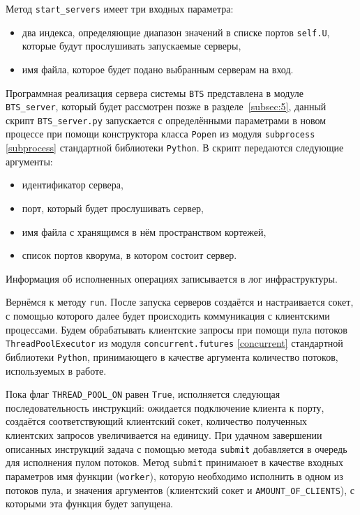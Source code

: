 Метод \texttt{start_servers} имеет три входных параметра:
\begin{itemize}
	\item два индекса, определяющие диапазон значений в списке портов \texttt{self.U}, которые будут прослушивать запускаемые серверы,
	\item имя файла, которое будет подано выбранным серверам на вход.
\end{itemize}
Программная реализация сервера системы \texttt{BTS} представлена в модуле \texttt{BTS_server}, который будет рассмотрен позже в разделе~\ref{subsec:5}, данный скрипт \texttt{BTS_server.py} запускается с определёнными параметрами в новом процессе при помощи конструктора класса \texttt{Popen} из модуля \texttt{subprocess} \ref{subprocess} стандартной библиотеки \texttt{Python}. В скрипт передаются следующие аргументы:
\begin{itemize}
	\item идентификатор сервера,
	\item порт, который будет прослушивать сервер,
	\item имя файла с хранящимся в нём пространством кортежей,
	\item список портов кворума, в котором состоит сервер.
\end{itemize}
Информация об исполненных операциях записывается в лог инфраструктуры.

Вернёмся к методу \texttt{run}. После запуска серверов создаётся и настраивается сокет, с помощью которого далее будет происходить коммуникация с клиентскими процессами. Будем обрабатывать клиентские запросы при помощи пула потоков \texttt{ThreadPoolExecutor} из модуля \texttt{concurrent.futures} \ref{concurrent} стандартной библиотеки \texttt{Python}, принимающего в качестве аргумента количество потоков, используемых в работе.

Пока флаг \texttt{THREAD_POOL_ON} равен \texttt{True}, исполняется следующая последовательность инструкций: ожидается подключение клиента к порту, создаётся соответствующий клиентский сокет, количество полученных клиентских запросов увеличивается на единицу. При удачном завершении описанных инструкций задача с помощью метода \texttt{submit} добавляется в очередь для исполнения пулом потоков. Метод \texttt{submit} принимаюет в качестве входных параметров имя функции (\texttt{worker}), которую необходимо исполнить в одном из потоков пула, и значения аргументов (клиентский сокет и \texttt{AMOUNT_OF_CLIENTS}), с которыми эта функция будет запущена.

